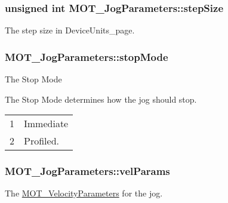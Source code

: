 \subsubsection[{\texorpdfstring{step\+Size}{stepSize}}]{\setlength{\rightskip}{0pt plus 5cm}unsigned int M\+O\+T\+\_\+\+Jog\+Parameters\+::step\+Size}\hypertarget{struct_m_o_t___jog_parameters_aa9d309a4d04ddbdd7808e80e3e8d2be6}{}\label{struct_m_o_t___jog_parameters_aa9d309a4d04ddbdd7808e80e3e8d2be6}


The step size in Device\+Units\+\_\+page. 

\subsubsection[{\texorpdfstring{stop\+Mode}{stopMode}}]{ M\+O\+T\+\_\+\+Jog\+Parameters\+::stop\+Mode}\hypertarget{struct_m_o_t___jog_parameters_ab5411ddac06335df299b4de841a31575}{}\label{struct_m_o_t___jog_parameters_ab5411ddac06335df299b4de841a31575}


The Stop Mode

The Stop Mode determines how the jog should stop. \tabulinesep=1mm
\begin{longtabu} spread 0pt [c]{*2{|X[-1]}|}
&Immediate \\
2&Profiled. \\
\end{longtabu}
\subsubsection[{\texorpdfstring{vel\+Params}{velParams}}]{ M\+O\+T\+\_\+\+Jog\+Parameters\+::vel\+Params}\hypertarget{struct_m_o_t___jog_parameters_acb940bd7d08f4ef13a1d7657bc980f66}{}\label{struct_m_o_t___jog_parameters_acb940bd7d08f4ef13a1d7657bc980f66}


The \hyperlink{struct_m_o_t___velocity_parameters}{M\+O\+T\+\_\+\+Velocity\+Parameters} for the jog. 



